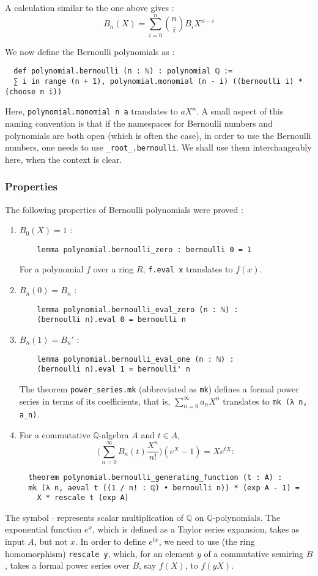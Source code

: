 \documentclass[a4paper,UKenglish,cleveref, autoref, thm-restate]{lipics-v2021}
\newcommand{\lean}[1]{\texttt{#1}\xspace} %
\begin{document}
A calculation similar to the one above gives :
$$ B_n (X) = \sum_{i = 0}^n {n \choose i} B_i X^{n - i} $$

We now define the Bernoulli polynomials as :
\begin{lstlisting}
  def polynomial.bernoulli (n : ℕ) : polynomial ℚ :=
  ∑ i in range (n + 1), polynomial.monomial (n - i) ((bernoulli i) * (choose n i))
\end{lstlisting}

Here, \lean{polynomial.monomial n a} translates to $a X^n$. A small aspect of this 
naming convention is that if the namespaces for Bernoulli numbers and polynomials are both open 
(which is often the case), in order to use the Bernoulli numbers, one needs to use \lean{\_root\_.bernoulli}. 
We shall use them interchangeably here, when the context is clear. \\

\subsubsection{Properties}
The following properties of Bernoulli polynomials were proved :
\begin{enumerate}
  \item $ B_0(X) = 1 $ : \begin{lstlisting}
    lemma polynomial.bernoulli_zero : bernoulli 0 = 1
  \end{lstlisting}
  For a polynomial $f$ over a ring $R$, \lean{f.eval x} translates to $f(x)$.
  \item $ B_n(0) = B_n $ : \begin{lstlisting}
    lemma polynomial.bernoulli_eval_zero (n : ℕ) : 
    (bernoulli n).eval 0 = bernoulli n
  \end{lstlisting}
  \item $ B_n(1) = B_n' $ : \begin{lstlisting}
    lemma polynomial.bernoulli_eval_one (n : ℕ) : 
    (bernoulli n).eval 1 = bernoulli' n
  \end{lstlisting}
  The theorem \lean{power\_series.mk} (abbreviated as \lean{mk}) defines a formal power series in terms of its
  coefficients, that is, $\sum_{n = 0}^{\infty} a_n X^n$ translates to \lean{mk (λ n, a\_n)}.
  \item For a commutative $\mathbb{Q}$-algebra $A$ and $t \in A$, 
  $$ \bigg( \sum_{n = 0}^{\infty} B_n(t) \frac{X^n}{n!} \bigg) (e^X - 1) = X e^{tX} : $$
  \begin{lstlisting}
  theorem polynomial.bernoulli_generating_function (t : A) :
  mk (λ n, aeval t ((1 / n! : ℚ) • bernoulli n)) * (exp A - 1) = 
    X * rescale t (exp A)
  \end{lstlisting}
\end{enumerate} 
The symbol \lean{$\cdot$} represents scalar multiplication of $\mathbb{Q}$ on $\mathbb{Q}$-polynomials. 
The exponential function $e^{x}$, which is defined as a Taylor series expansion,
takes as input $A$, but not $x$. In order to define $e^{tx}$, we need to use
(the ring homomorphism) \lean{rescale y}, which, for an element $y$ of a commutative semiring $B$,
takes a formal power series over $B$, say $f(X)$, to $f(yX)$. \\
\end{document}
